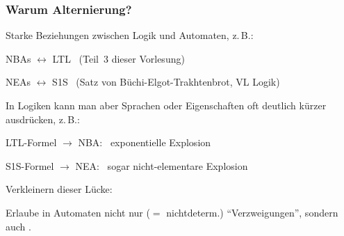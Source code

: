   \begin{frame}
    \frametitle{Warum Alternierung?}
    
    \begin{Itemize}
      \item
        Starke Beziehungen zwischen Logik und Automaten, z.\,B.:
        \begin{Itemize}
          \item
            NBAs $\leftrightarrow$ LTL~ (Teil~3 dieser Vorlesung)
          \item
            NEAs $\leftrightarrow$ S1S~ (Satz von Büchi-Elgot-Trakhtenbrot, VL Logik)
        \end{Itemize}
        \parI
      \item
        In Logiken kann man aber Sprachen oder Eigenschaften oft deutlich kürzer ausdrücken, z.\,B.:
        \begin{Itemize}
          \item
            LTL-Formel $\to$ NBA:~ exponentielle Explosion
          \item
            S1S-Formel $\to$ NEA:~ sogar nicht-elementare Explosion
        \end{Itemize}
        \parI
      \item
        Verkleinern dieser Lücke:
        
        \parI
        Erlaube in Automaten nicht nur  ($=$ nichtdeterm.) "`Verzweigungen"',
        sondern auch .
    \end{Itemize}

  \end{frame}

